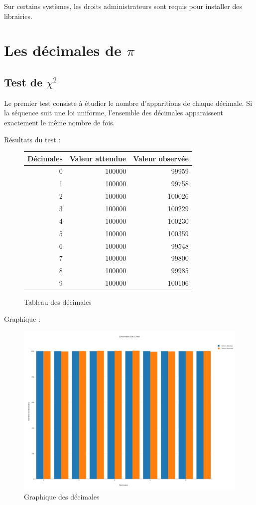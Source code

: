 \documentclass[10pt,a4paper]{article}
\begin{document}
	Sur certains systèmes, les droits administrateurs sont requis pour installer des librairies.
	
	\newpage
	\section{Les décimales de $\pi$}
	
	\subsection{Test de $\chi^2$}
	Le premier test consiste à étudier le nombre d'apparitions de chaque décimale. Si la séquence suit une loi uniforme, l'ensemble des décimales apparaissent exactement le même nombre de fois.
	
	
	Résultats du test :
	\begin{figure}[h]
		\centering
		\begin{tabular}{|r|r|r|}
			\hline
			Décimales & Valeur attendue & Valeur observée\\
			\hline
			0 & 100000 & 99959\\
			1 & 100000 & 99758\\
			2 & 100000 & 100026\\
			3 & 100000 & 100229\\
			4 & 100000 & 100230\\
			5 & 100000 & 100359\\
			6 & 100000 & 99548\\
			7 & 100000 & 99800\\
			8 & 100000 & 99985\\
			9 & 100000 & 100106\\
			\hline
		\end{tabular}
		\caption{Tableau des décimales}
	\end{figure}
	
	Graphique :
	\begin{figure}[h]
		\centering
		\includegraphics[scale=0.25]{../chart_images/decimales_bar_chart.png}
		\caption{Graphique des décimales}
	\end{figure}
	
\end{document}
